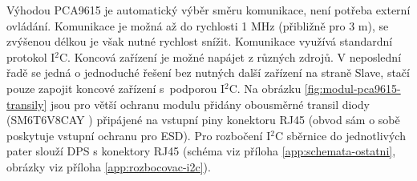 Výhodou PCA9615 je automatický výběr směru komunikace, není potřeba externí ovládání. Komunikace je možná až do rychlosti 1 MHz (přibližně pro 3 m), se zvýšenou délkou je však nutné rychlost snížit. Komunikace využívá standardní protokol I$^2$C. Koncová zařízení je možné napájet z různých zdrojů. V neposlední řadě se jedná o jednoduché řešení bez nutných další zařízení na straně Slave, stačí pouze zapojit koncové zařízení s~podporou I$^2$C. Na obrázku \ref{fig:modul-pca9615-transily} jsou pro větší ochranu modulu přidány obousměrné transil diody (SM6T6V8CAY \cite{sm6t6v8cay}) připájené na vstupní piny konektoru RJ45 (obvod sám o sobě poskytuje vstupní ochranu pro ESD). Pro rozbočení I$^2$C sběrnice do jednotlivých pater slouží DPS s konektory RJ45 (schéma viz příloha \ref{app:schemata-ostatni}, obrázky viz příloha \ref{app:rozbocovac-i2c}).

